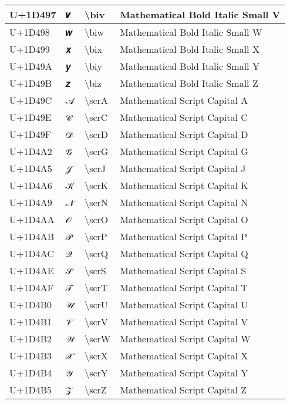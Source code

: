 \begin{table}[h]
\begin{tabulary}{\linewidth}{|L|L|L|L|}
\hline
U+1D497 & 𝒗 & {\textbackslash}biv & Mathematical Bold Italic Small V \\
\hline
U+1D498 & 𝒘 & {\textbackslash}biw & Mathematical Bold Italic Small W \\
\hline
U+1D499 & 𝒙 & {\textbackslash}bix & Mathematical Bold Italic Small X \\
\hline
U+1D49A & 𝒚 & {\textbackslash}biy & Mathematical Bold Italic Small Y \\
\hline
U+1D49B & 𝒛 & {\textbackslash}biz & Mathematical Bold Italic Small Z \\
\hline
U+1D49C & 𝒜 & {\textbackslash}scrA & Mathematical Script Capital A \\
\hline
U+1D49E & 𝒞 & {\textbackslash}scrC & Mathematical Script Capital C \\
\hline
U+1D49F & 𝒟 & {\textbackslash}scrD & Mathematical Script Capital D \\
\hline
U+1D4A2 & 𝒢 & {\textbackslash}scrG & Mathematical Script Capital G \\
\hline
U+1D4A5 & 𝒥 & {\textbackslash}scrJ & Mathematical Script Capital J \\
\hline
U+1D4A6 & 𝒦 & {\textbackslash}scrK & Mathematical Script Capital K \\
\hline
U+1D4A9 & 𝒩 & {\textbackslash}scrN & Mathematical Script Capital N \\
\hline
U+1D4AA & 𝒪 & {\textbackslash}scrO & Mathematical Script Capital O \\
\hline
U+1D4AB & 𝒫 & {\textbackslash}scrP & Mathematical Script Capital P \\
\hline
U+1D4AC & 𝒬 & {\textbackslash}scrQ & Mathematical Script Capital Q \\
\hline
U+1D4AE & 𝒮 & {\textbackslash}scrS & Mathematical Script Capital S \\
\hline
U+1D4AF & 𝒯 & {\textbackslash}scrT & Mathematical Script Capital T \\
\hline
U+1D4B0 & 𝒰 & {\textbackslash}scrU & Mathematical Script Capital U \\
\hline
U+1D4B1 & 𝒱 & {\textbackslash}scrV & Mathematical Script Capital V \\
\hline
U+1D4B2 & 𝒲 & {\textbackslash}scrW & Mathematical Script Capital W \\
\hline
U+1D4B3 & 𝒳 & {\textbackslash}scrX & Mathematical Script Capital X \\
\hline
U+1D4B4 & 𝒴 & {\textbackslash}scrY & Mathematical Script Capital Y \\
\hline
U+1D4B5 & 𝒵 & {\textbackslash}scrZ & Mathematical Script Capital Z \\

\end{tabulary}
\end{table}
